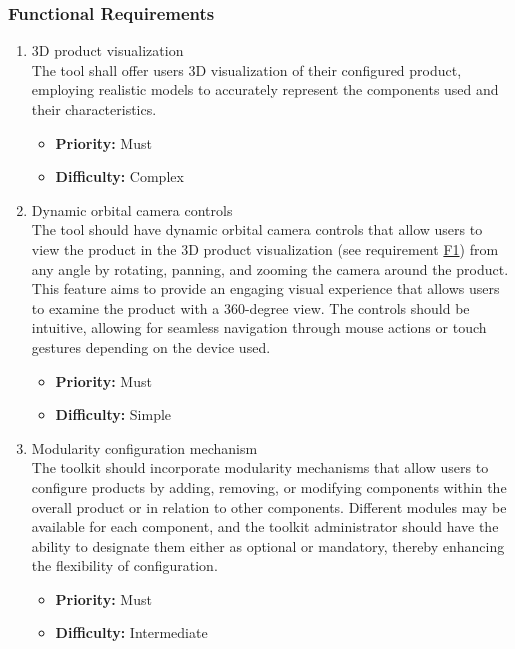 \subsubsection{Functional Requirements}

\begin{enumerate}[label=\textbf{F\arabic*:}, leftmargin=*]
\item \label{itm:F1} 3D product visualization
\vspace{2pt}
\\The tool shall offer users 3D visualization of their configured product, employing realistic models to accurately represent the components used and their characteristics.
\begin{itemize}[noitemsep, label=\trianglebullet]
    \item \textbf{Priority:} Must
    \item \textbf{Difficulty:} Complex
\end{itemize}
\vspace{4pt}

\item \label{itm:F2} Dynamic orbital camera controls
\vspace{2pt}
\\The tool should have dynamic orbital camera controls that allow users to view the product in the 3D product visualization (see requirement \hyperref[itm:F1]{F1}) from any angle by rotating, panning, and zooming the camera around the product. This feature aims to provide an engaging visual experience that allows users to examine the product with a 360-degree view. The controls should be intuitive, allowing for seamless navigation through mouse actions or touch gestures depending on the device used.
\begin{itemize}[noitemsep, label=\trianglebullet]
    \item \textbf{Priority:} Must
    \item \textbf{Difficulty:} Simple
\end{itemize}
\vspace{4pt}

\item \label{itm:F3} Modularity configuration mechanism
\vspace{2pt}
\\The toolkit should incorporate modularity mechanisms that allow users to configure products by adding, removing, or modifying components within the overall product or in relation to other components. Different modules may be available for each component, and the toolkit administrator should have the ability to designate them either as optional or mandatory, \phantom{thereby enhancing the flexibility of configuration.}\newpage thereby enhancing the flexibility of configuration.
\begin{itemize}[noitemsep, label=\trianglebullet]
    \item \textbf{Priority:} Must
    \item \textbf{Difficulty:} Intermediate
\end{itemize}
\vspace{4pt}


\end{enumerate}
